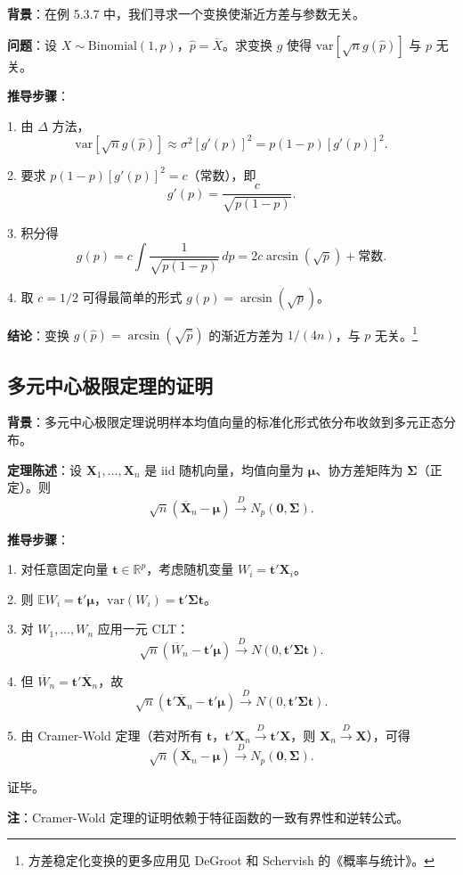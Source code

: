 \textbf{背景}：在例 5.3.7 中，我们寻求一个变换使渐近方差与参数无关。

\textbf{问题}：设 $X \sim \mathrm{Binomial}(1, p)$，$\widehat{p} = \overline{X}$。求变换 $g$ 使得 $\text{var}[\sqrt{n}g(\widehat{p})]$ 与 $p$ 无关。

\textbf{推导步骤}：

1. 由 $\Delta$ 方法，
\[
\text{var}[\sqrt{n}g(\widehat{p})] \approx \sigma^2 [g'(p)]^2 = p(1-p)[g'(p)]^2.
\label{eq:variance-stabilization-1}
\]

2. 要求 $p(1-p)[g'(p)]^2 = c$（常数），即
\[
g'(p) = \frac{c}{\sqrt{p(1-p)}}.
\label{eq:variance-stabilization-2}
\]

3. 积分得
\[
g(p) = c \int \frac{1}{\sqrt{p(1-p)}}\,dp = 2c \arcsin(\sqrt{p}) + \text{常数}.
\label{eq:variance-stabilization-3}
\]

4. 取 $c = 1/2$ 可得最简单的形式 $g(p) = \arcsin(\sqrt{p})$。

\textbf{结论}：变换 $g(\widehat{p}) = \arcsin(\sqrt{\widehat{p}})$ 的渐近方差为 $1/(4n)$，与 $p$ 无关。\footnote{方差稳定化变换的更多应用见 DeGroot 和 Schervish 的《概率与统计》。}

\subsection{多元中心极限定理的证明}\label{sec:multivariate-clt-proof}

\textbf{背景}：多元中心极限定理说明样本均值向量的标准化形式依分布收敛到多元正态分布。

\textbf{定理陈述}：设 $\mathbf{X}_1, \ldots, \mathbf{X}_n$ 是 iid 随机向量，均值向量为 $\boldsymbol{\mu}$、协方差矩阵为 $\boldsymbol{\Sigma}$（正定）。则
\[
\sqrt{n}(\overline{\mathbf{X}}_n - \boldsymbol{\mu}) \xrightarrow{D} N_p(\mathbf{0}, \boldsymbol{\Sigma}).
\label{eq:multivariate-clt-full}
\]

\textbf{推导步骤}：

1. 对任意固定向量 $\mathbf{t} \in \mathbb{R}^p$，考虑随机变量 $W_i = \mathbf{t}'\mathbf{X}_i$。

2. 则 $\mathbb{E}W_i = \mathbf{t}'\boldsymbol{\mu}$，$\text{var}(W_i) = \mathbf{t}'\boldsymbol{\Sigma}\mathbf{t}$。

3. 对 $W_1, \ldots, W_n$ 应用一元 CLT：
\[
\sqrt{n}(\overline{W}_n - \mathbf{t}'\boldsymbol{\mu}) \xrightarrow{D} N(0, \mathbf{t}'\boldsymbol{\Sigma}\mathbf{t}).
\label{eq:multivariate-clt-linear}
\]

4. 但 $\overline{W}_n = \mathbf{t}'\overline{\mathbf{X}}_n$，故
\[
\sqrt{n}(\mathbf{t}'\overline{\mathbf{X}}_n - \mathbf{t}'\boldsymbol{\mu}) \xrightarrow{D} N(0, \mathbf{t}'\boldsymbol{\Sigma}\mathbf{t}).
\label{eq:multivariate-clt-linear2}
\]

5. 由 Cramer-Wold 定理（若对所有 $\mathbf{t}$，$\mathbf{t}'\mathbf{X}_n \xrightarrow{D} \mathbf{t}'\mathbf{X}$，则 $\mathbf{X}_n \xrightarrow{D} \mathbf{X}$），可得
\[
\sqrt{n}(\overline{\mathbf{X}}_n - \boldsymbol{\mu}) \xrightarrow{D} N_p(\mathbf{0}, \boldsymbol{\Sigma}).
\label{eq:multivariate-clt-final}
\]

证毕。

\textbf{注}：Cramer-Wold 定理的证明依赖于特征函数的一致有界性和逆转公式。

